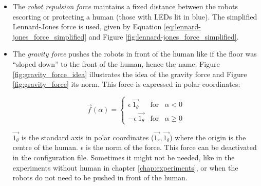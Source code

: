 \documentclass[oneside, a4paper, 12pt]{memoir}
\newcommand{\epuckblue}[3][0] %
{
	\draw [very thick, fill=RoyalBlue] (#2,#3) circle [radius=0.5];
	\draw [very thick, rotate around={#1:(#2,#3)}] (#2-0.25,#3-0.433) -- (#2,#3+0.45) -- (#2+0.25,#3-0.433);
}
\newcommand{\human}[3][0] %
{
	\draw [very thick, fill=white, rotate around={#1:(#2,#3)}] (#2-1,#3+0.5) ellipse (0.25cm and 0.5cm);
	\draw [very thick, fill=white, rotate around={#1:(#2,#3)}] (#2+1,#3+0.5) ellipse (0.25cm and 0.5cm);
	\draw [very thick, fill=white, rotate around={#1:(#2,#3)}] (#2,#3) ellipse (1.5cm and 0.75cm);
	\draw [thick, fill=white, rotate around={#1:(#2,#3)}] (#2-0.05,#3+1) -- (#2,#3+1.1) -- (#2+0.05,#3+1);
	\draw [very thick, fill=white, rotate around={#1:(#2,#3)}] (#2,#3+0.5) circle [radius=0.5cm];
}
\begin{document}
\begin{itemize}
				\item The \emph{robot repulsion force} maintains a fixed distance between the robots escorting or protecting a human (those with LEDs lit in blue). The simplified Lennard-Jones force is used, given by Equation \ref{eq:lennard-jones_force_simplified} and Figure \ref{fig:lennard-jones_force_simplified}.
				\item The \emph{gravity force} pushes the robots in front of the human like if the floor was \enquote{sloped down} to the front of the human, hence the name. Figure \ref{fig:gravity_force_idea} illustrates the idea of the gravity force and Figure \ref{fig:gravity_force} its norm. This force is expressed in polar coordinates:
				
				\begin{equation}
					\vec{f}(\alpha) = \left\{ \begin{array}{rcl}
						\epsilon ~\vec{1_\theta} & \mbox{for} & \alpha < 0 \\
						-\epsilon ~\vec{1_\theta} & \mbox{for} & \alpha \geq 0
						\end{array}\right.
				\end{equation}
				
				$\vec{1_\theta}$ is the standard axis in polar coordinates ($\vec{1_r},\vec{1_\theta}$) where the origin is the centre of the human. $\epsilon$ is the norm of the force. This force can be deactivated in the configuration file. Sometimes it might not be needed, like in the experiments without human in chapter \ref{chap:experiments}, or when the robots do not need to be pushed in front of the human.
				
				\begin{figure}[!htp]\centering
					

\end{figure}
\end{itemize}
\end{document}
